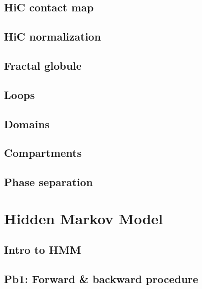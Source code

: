 \documentclass[
]{book}
\begin{document}
\hypertarget{hic-contact-map}{%
\section{HiC contact map}\label{hic-contact-map}}

\hypertarget{hic-normalization}{%
\section{HiC normalization}\label{hic-normalization}}

\hypertarget{fractal-globule}{%
\section{Fractal globule}\label{fractal-globule}}

\hypertarget{loops}{%
\section{Loops}\label{loops}}

\hypertarget{domains}{%
\section{Domains}\label{domains}}

\hypertarget{compartments}{%
\section{Compartments}\label{compartments}}

\hypertarget{phase-separation}{%
\section{Phase separation}\label{phase-separation}}

\hypertarget{hmm}{%
\chapter{Hidden Markov Model}\label{hmm}}

\hypertarget{intro-to-hmm}{%
\section{Intro to HMM}\label{intro-to-hmm}}

\hypertarget{pb1-forward-backward-procedure}{%
\section{Pb1: Forward \& backward procedure}\label{pb1-forward-backward-procedure}}
\end{document}
